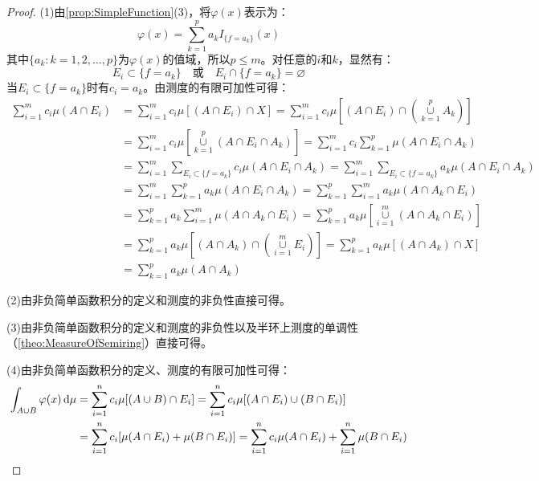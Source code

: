 \begin{proof}
	(1)由\cref{prop:SimpleFunction}(3)，将$\varphi(x)$表示为：
	\begin{equation*}
		\varphi(x)=\sum_{k=1}^{p}a_kI_{\{f=a_k\}}(x)
	\end{equation*}
	其中$\{a_k:k=1,2,\dots,p\}$为$\varphi(x)$的值域，所以$p\leqslant m$。对任意的$i$和$k$，显然有：
	\begin{equation*}
		E_i\subset\{f=a_k\}\quad\text{或}\quad E_i\cap\{f=a_k\}=\varnothing
	\end{equation*}
	当$E_i\subset\{f=a_k\}$时有$c_i=a_k$。由测度的有限可加性可得：
	\begin{align*}
		\sum_{i=1}^{m}c_i\mu(A\cap E_i)
		&=\sum_{i=1}^{m}c_i\mu[(A\cap E_i)\cap X]
		=\sum_{i=1}^{m}c_i\mu\left[(A\cap E_i)\cap\left(\underset{k=1}{\overset{p}{\cup}}A_k\right)\right] \\
		&=\sum_{i=1}^{m}c_i\mu\left[\underset{k=1}{\overset{p}{\cup}}(A\cap E_i\cap A_k)\right]
		=\sum_{i=1}^{m}c_i\sum_{k=1}^{p}\mu(A\cap E_i\cap A_k) \\
		&=\sum_{i=1}^{m}\sum_{E_i\subset\{f=a_k\}}^{}c_i\mu(A\cap E_i\cap A_k)
		=\sum_{i=1}^{m}\sum_{E_i\subset\{f=a_k\}}^{}a_k\mu(A\cap E_i\cap A_k) \\
		&=\sum_{i=1}^{m}\sum_{k=1}^{p}a_k\mu(A\cap E_i\cap A_k)
		=\sum_{k=1}^{p}\sum_{i=1}^{m}a_k\mu(A\cap A_k\cap E_i) \\
		&=\sum_{k=1}^{p}a_k\sum_{i=1}^{m}\mu(A\cap A_k\cap E_i)
		=\sum_{k=1}^{p}a_k\mu\left[\underset{i=1}{\overset{m}{\cup}}(A\cap A_k\cap E_i)\right] \\
		&=\sum_{k=1}^{p}a_k\mu\left[(A\cap A_k)\cap\left(\underset{i=1}{\overset{m}{\cup}}E_i\right)\right]
		=\sum_{k=1}^{p}a_k\mu[(A\cap A_k)\cap X] \\
		&=\sum_{k=1}^{p}a_k\mu(A\cap A_k)
	\end{align*}\par
	(2)由非负简单函数积分的定义和测度的非负性直接可得。\par
	(3)由非负简单函数积分的定义和测度的非负性以及半环上测度的单调性（\cref{theo:MeasureOfSemiring}）直接可得。\par
	(4)由非负简单函数积分的定义、测度的有限可加性可得：
	\begin{align*}
		\int_{A\cup B}\varphi(x)\dif\mu
		&=\sum_{i=1}^{n}c_i\mu[(A\cup B)\cap E_i]
		=\sum_{i=1}^{n}c_i\mu[(A\cap E_i)\cup(B\cap E_i)] \\
		&=\sum_{i=1}^{n}c_i[\mu(A\cap E_i)+\mu(B\cap E_i)]
		=\sum_{i=1}^{n}c_i\mu(A\cap E_i)+\sum_{i=1}^{n}\mu(B\cap E_i) \\

\end{align*}
\end{proof}
